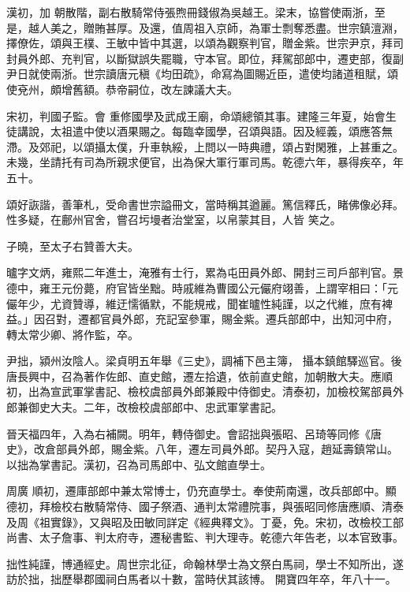 \begin{pinyinscope}
 漢初，加
 朝散階，副右散騎常侍張煦冊錢俶為吳越王。梁末，協嘗使兩浙，至是，越人美之，贈賄甚厚。及還，值周祖入京師，為軍士剽奪悉盡。世宗鎮澶淵，擇僚佐，頌與王樸、王敏中皆中其選，以頌為觀察判官，贈金紫。世宗尹京，拜司封員外郎、充判官，以斷獄誤失罷職，守本官。即位，拜駕部郎中，遷吏部，復副尹日就使兩浙。世宗讀唐元稹《均田疏》，命寫為圖賜近臣，遣使均諸道租賦，頌使兗州，頗增舊額。恭帝嗣位，改左諫議大夫。



 宋初，判國子監。會
 重修國學及武成王廟，命頌總領其事。建隆三年夏，始會生徒講說，太祖遣中使以酒果賜之。每臨幸國學，召頌與語。因及經義，頌應答無滯。及郊祀，以頌攝太僕，升車執綏，上問以一時典禮，頌占對閑雅，上甚重之。未幾，坐請托有司為所親求便官，出為保大軍行軍司馬。乾德六年，暴得疾卒，年五十。



 頌好詼諧，善筆札，受命書世宗謚冊文，當時稱其遒麗。篤信釋氏，睹佛像必拜。性多疑，在鄜州官舍，嘗召圬墁者治堂室，以帛蒙其目，人皆
 笑之。



 子曉，至太子右贊善大夫。



 曥字文炳，雍熙二年進士，淹雅有士行，累為屯田員外郎、開封三司戶部判官。景德中，雍王元份薨，府官皆坐黜。時戚維為曹國公元儼府翊善，上謂宰相曰：「元儼年少，尤資贊導，維迂懦循默，不能規戒，聞崔曥性純謹，以之代維，庶有裨益。」因召對，遷都官員外郎，充記室參軍，賜金紫。遷兵部郎中，出知河中府，轉太常少卿、將作監，卒。



 尹拙，潁州汝陰人。梁貞明五年舉《三史》，調補下邑主簿，
 攝本鎮館驛巡官。後唐長興中，召為著作佐郎、直史館，遷左拾遺，依前直史館，加朝散大夫。應順初，出為宣武軍掌書記、檢校虞部員外郎兼殿中侍御史。清泰初，加檢校駕部員外郎兼御史大夫。二年，改檢校虞部郎中、忠武軍掌書記。



 晉天福四年，入為右補闕。明年，轉侍御史。會詔拙與張昭、呂琦等同修《唐史》，改倉部員外郎，賜金紫。八年，遷左司員外郎。契丹入寇，趙延壽鎮常山。以拙為掌書記。漢初，召為司馬郎中、弘文館直學士。



 周廣
 順初，遷庫部郎中兼太常博士，仍充直學士。奉使荊南還，改兵部郎中。顯德初，拜檢校右散騎常侍、國子祭酒、通判太常禮院事，與張昭同修唐應順、清泰及周《祖實錄》，又與昭及田敏同詳定《經典釋文》。丁憂，免。宋初，改檢校工部尚書、太子詹事、判太府寺，遷秘書監、判大理寺。乾德六年告老，以本官致事。



 拙性純謹，博通經史。周世宗北征，命翰林學士為文祭白馬祠，學士不知所出，遂訪於拙，拙歷舉郡國祠白馬者以十數，當時伏其該博。
 開寶四年卒，年八十一。




\end{pinyinscope}
